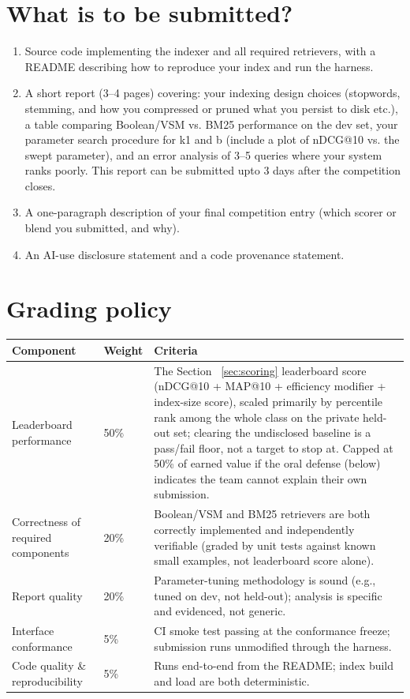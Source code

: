 \documentclass[10pt]{article}
\begin{document}
\section{What is to be submitted?}
\begin{enumerate}
\item Source code implementing the indexer and all required retrievers, with a README describing how to reproduce your index and run the harness.
\item A short report (3–4 pages) covering: your indexing design choices (stopwords, stemming, and how you compressed or pruned what you persist to disk etc.), a table comparing Boolean/VSM vs. BM25 performance on the dev set, your parameter search procedure for k1 and b (include a plot of nDCG@10 vs. the swept parameter), and an error analysis of 3–5 queries where your system ranks poorly. This report can be submitted upto 3 days after the competition closes.
\item A one-paragraph description of your final competition entry (which scorer or blend you submitted, and why).
\item An AI-use disclosure statement and a code provenance statement.
\end{enumerate}


\section{Grading policy}
\begin{center}
\begin{tabular}{|p{3.5cm}|l|p{10cm}|} 
\hline	
\textbf{Component} &	Weight &	Criteria \\
\hline
\hline
Leaderboard performance	& 50\%	& The Section ~\ref{sec:scoring} leaderboard score (nDCG@10 + MAP@10 + efficiency modifier + index-size score), scaled primarily by percentile rank among the whole class on the private held-out set; clearing the undisclosed baseline is a pass/fail floor, not a target to stop at. Capped at 50\% of earned value if the oral defense (below) indicates the team cannot explain their own submission.\\
\hline
Correctness of required components	& 20\%	& Boolean/VSM and BM25 retrievers are both correctly implemented and independently verifiable (graded by unit tests against known small examples, not leaderboard score alone). \\
\hline
Report quality	& 20\%	& Parameter-tuning methodology is sound (e.g., tuned on dev, not held-out); analysis is specific and evidenced, not generic. \\
\hline
Interface conformance	& 5\%	& CI smoke test passing at the conformance freeze; submission runs unmodified through the harness.\\
\hline
Code quality \& reproducibility	& 5\%	& Runs end-to-end from the README; index build and load are both deterministic.\\
\hline

\end{tabular}
\end{center}
\end{document}
